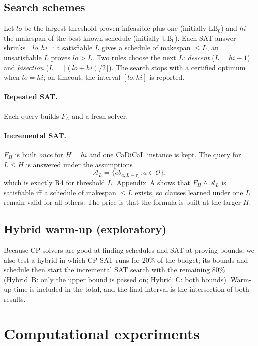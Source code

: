 \documentclass[a4paper,fleqn]{cas-sc}
\newcommand{\eb}{\mathit{eb}}
\begin{document}
\subsection{Search schemes}
Let $lo$ be the largest threshold proven infeasible plus one (initially $\mathrm{LB}_0$) and $hi$ the makespan of the best known schedule (initially $\mathrm{UB}_0$).
Each SAT answer shrinks $[lo,hi]$: a satisfiable $L$ gives a schedule of makespan $\le L$, an unsatisfiable $L$ proves $lo>L$.
Two rules choose the next $L$: \emph{descent} ($L=hi-1$) and \emph{bisection} ($L=\lfloor(lo+hi)/2\rfloor$).
The search stops with a certified optimum when $lo=hi$; on timeout, the interval $[lo,hi]$ is reported.

\paragraph{Repeated SAT.} Each query builds $F_L$ and a fresh solver.

\paragraph{Incremental SAT.}
$F_H$ is built \emph{once} for $H=hi$ and one CaDiCaL instance is kept.
The query for $L\le H$ is answered under the assumptions
\begin{equation}
  \mathcal A_L=\{\eb_{a,L-\tau_a}: a\in\mathcal O\},
\end{equation}
which is exactly R4 for threshold $L$.
Appendix~A shows that $F_H\wedge\mathcal A_L$ is satisfiable iff a schedule of makespan $\le L$ exists, so clauses learned under one $L$ remain valid for all others.
The price is that the formula is built at the larger $H$.

\subsection{Hybrid warm-up (exploratory)}
Because CP solvers are good at finding schedules and SAT at proving bounds, we also test a hybrid in which CP-SAT runs for 20\% of the budget; its bounds and schedule then start the incremental SAT search with the remaining 80\% (Hybrid~B: only the upper bound is passed on; Hybrid~C: both bounds).
Warm-up time is included in the total, and the final interval is the intersection of both results.

\section{Computational experiments}\label{sec:exp}
\end{document}
